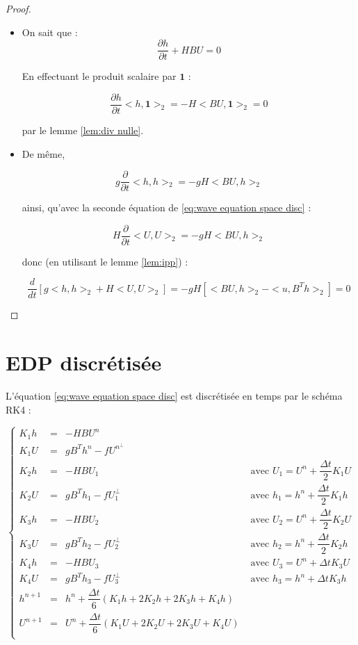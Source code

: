 \documentclass[10pt,a4paper]{article}
\begin{document}
\begin{proof}
\begin{itemize}
\item On sait que :
$$\dfrac{\partial h}{\partial t} + H B U = 0$$

En effectuant le produit scalaire par $\mathbf{1}$ :

$$
\dfrac{\partial h}{\partial t} <h, \mathbf{1}>_2 = -H <BU, \mathbf{1}>_2 = 0
$$

par le lemme \ref{lem:div nulle}.

\item De même,

$$
g \dfrac{\partial}{\partial t} <h,h>_2 = -gH <BU,h>_2
$$

ainsi, qu'avec la seconde équation de \eqref{eq:wave equation space disc} :

$$
H \dfrac{\partial}{\partial t} <U,U>_2 = -gH <BU,h>_2
$$

donc (en utilisant le lemme \ref{lem:ipp}) :

$$
\dfrac{d}{dt} \left[ g <h,h>_2 + H<U,U>_2 \right] = -gH \left[ <BU,h>_2-<u,B^Th>_2 \right] = 0
$$
\end{itemize}
\end{proof}

\section{EDP discrétisée}

L'équation \eqref{eq:wave equation space disc} est discrétisée en temps par le schéma RK4 :

\begin{equation}
\left\lbrace
\begin{array}{rcll}
K_1 h & = & -H B U^n & \\
K_1 U & = & g B^T h^n - f U^{n^{\perp}} & \\
K_2 h & = & -H B U_1 & \text{ avec } U_1 = U^n + \dfrac{\Delta t}{2} K_1 U\\
K_2 U & = & g B^T h_1 - f U_1^{\perp} & \text{ avec } h_1 = h^n + \dfrac{\Delta t}{2} K_1 h\\
K_3 h & = & -H B U_2 & \text{ avec } U_2 = U^n + \dfrac{\Delta t}{2} K_2 U\\
K_3 U & = & g B^T h_2 - f U_2^{\perp} & \text{ avec } h_2 = h^n + \dfrac{\Delta t}{2} K_2 h\\
K_4 h & = & -H B U_3 & \text{ avec } U_3 = U^n + \Delta t K_3 U\\
K_4 U & = & g B^T h_3 - f U_3^{\perp} & \text{ avec } h_3 = h^n + \Delta t K_3 h\\
h^{n+1} & = & h^n + \dfrac{\Delta t}{6} \left( K_1h + 2 K_2 h + 2 K_3 h + K_4 h \right) & \\
U^{n+1} & = & U^n + \dfrac{\Delta t}{6} \left( K_1 U + 2 K_2 U + 2 K_3 U + K_4 U \right) & \\
\end{array}
\right.
\label{eq:wave rk4}
\end{equation}
\end{document}
